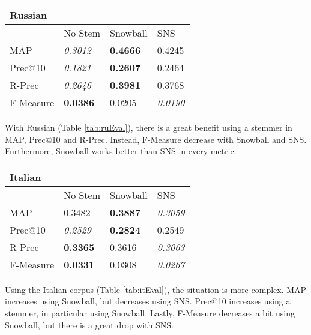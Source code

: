 \begin{center}
   \begin{tabular}{| l | l | l | l |}
    \hline
    \multicolumn{4}{|l|}{\textbf{Russian}}\\ \hline
    & No Stem & Snowball & SNS\\ \hline
    MAP & \textit{0.3012} & \textbf{0.4666} & 0.4245 \\ \hline
    Prec@10 & \textit{0.1821} & \textbf{0.2607}  & 0.2464 \\ \hline
    R-Prec & \textit{0.2646} & \textbf{0.3981} & 0.3768\\ \hline
    F-Measure & \textbf{0.0386} & 0.0205 & \textit{0.0190}\\ \hline    
    \end{tabular}
    \label{tab:ruEval}
\end{center}

With Russian (Table \ref{tab:ruEval}), there is a great benefit using a stemmer in MAP, Prec@10 and R-Prec. Instead, F-Measure decrease with Snowball and SNS. Furthermore, Snowball works better than SNS in every metric. 

\begin{center}
   \begin{tabular}{| l | l | l | l |}
    \hline
    \multicolumn{4}{|l|}{\textbf{Italian}}\\ \hline
    & No Stem & Snowball & SNS\\ \hline
    MAP & 0.3482 & \textbf{0.3887} & \textit{0.3059} \\ \hline
    Prec@10 & \textit{0.2529} & \textbf{0.2824} & 0.2549 \\ \hline
    R-Prec & \textbf{0.3365} & 0.3616 & \textit{0.3063}\\ \hline
    F-Measure & \textbf{0.0331} & 0.0308 & \textit{0.0267} \\ \hline    
    \end{tabular}
    \label{tab:itEval}
\end{center}

Using the Italian corpus (Table \ref{tab:itEval}), the situation is more complex. MAP increases using Snowball, but decreases using SNS. Prec@10 increases using a stemmer, in particular using Snowball. Lastly, F-Measure decreases a bit using Snowball, but there is a great drop with SNS.

